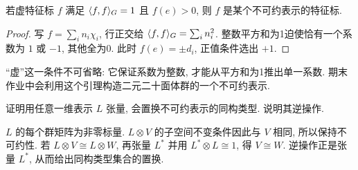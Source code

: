 \begin{lemma}\label{lem:virtualnorm}
若虚特征标 $f$ 满足 $\langle f,f\rangle_G=1$ 且 $f(e)>0$, 则 $f$ 是某个不可约表示的特征标.
\end{lemma}
\begin{proof}
写 $f=\sum_i n_i\chi_i$, 行正交给 $\langle f,f\rangle_G=\sum_i n_i^2$. 整数平方和为1迫使恰有一个系数为 $1$ 或 $-1$, 其他全为0. 此时 $f(e)=\pm d_i$, 正值条件选出 $+1$.
\end{proof}
“虚”这一条件不可省略: 它保证系数为整数, 才能从平方和为1推出单一系数. 期末作业中会利用这个引理构造二元二十面体群的一个不可约表示.

\begin{exercise}
证明用任意一维表示 $L$ 张量, 会置换不可约表示的同构类型. 说明其逆操作.
\end{exercise}
\begin{solution}
$L$ 的每个群矩阵为非零标量. $L\otimes V$ 的子空间不变条件因此与 $V$ 相同, 所以保持不可约性. 若 $L\otimes V\cong L\otimes W$, 再张量 $L^*$ 并用 $L^*\otimes L\cong1$, 得 $V\cong W$. 逆操作正是张量 $L^*$, 从而给出同构类型集合的置换.
\end{solution}
